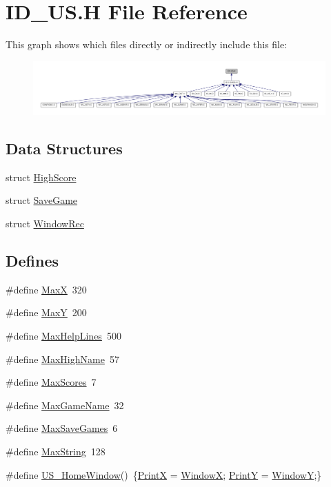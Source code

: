 \hypertarget{ID__US_8H}{
\section{ID\_\-US.H File Reference}
\label{ID__US_8H}
}
This graph shows which files directly or indirectly include this file:
\nopagebreak
\begin{figure}[H]
\begin{center}
\leavevmode
\includegraphics[width=400pt]{ID__US_8H__dep__incl}
\end{center}
\end{figure}
\subsection*{Data Structures}
\begin{DoxyCompactItemize}
\item 
struct \hyperlink{structHighScore}{HighScore}
\item 
struct \hyperlink{structSaveGame}{SaveGame}
\item 
struct \hyperlink{structWindowRec}{WindowRec}
\end{DoxyCompactItemize}
\subsection*{Defines}
\begin{DoxyCompactItemize}
\item 
\#define \hyperlink{ID__US_8H_a93952ac585139409afd79b1a1b61cfa7}{MaxX}~320
\item 
\#define \hyperlink{ID__US_8H_ae2ae2176ed49211e6403f49357cb5fdc}{MaxY}~200
\item 
\#define \hyperlink{ID__US_8H_a909a10be4fab6f0eed436c87d17920e9}{MaxHelpLines}~500
\item 
\#define \hyperlink{ID__US_8H_af6d3afd29d045cf4b34ab6b9ad5afa68}{MaxHighName}~57
\item 
\#define \hyperlink{ID__US_8H_a6cc14dc7719f85ae8dc70a8529882ddc}{MaxScores}~7
\item 
\#define \hyperlink{ID__US_8H_a7c274595deab3b8ade507abbc882b21c}{MaxGameName}~32
\item 
\#define \hyperlink{ID__US_8H_ae3bed0542e872abd122a710880841152}{MaxSaveGames}~6
\item 
\#define \hyperlink{ID__US_8H_ab154998a3a376095f3601bc35c5cf523}{MaxString}~128
\item 
\#define \hyperlink{ID__US_8H_af82bba8cbc36c0af7785e562eebbd2e0}{US\_\-HomeWindow}()~\{\hyperlink{ID__US__1_8C_af88ed0e04fa671a4e672334f1e0c4828}{PrintX} = \hyperlink{ID__US__1_8C_a961df5c1b62bed0978a9e2948458a05c}{WindowX}; \hyperlink{ID__US__1_8C_a9ba4b756f739163c3d3d5736cba818a4}{PrintY} = \hyperlink{ID__US__1_8C_a8bde891542c367fab8f3a9dfb9d2250e}{WindowY};\}
\end{DoxyCompactItemize}
